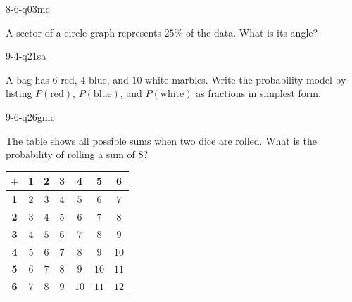 \begin{practiceQuestion}{8-6-q03}{mc}
\begin{questionText}
A sector of a circle graph represents $25\%$ of the data. What is its angle?
\end{questionText}
\end{practiceQuestion}

\begin{practiceQuestion}{9-4-q21}{sa}
\begin{questionText}
A bag has $6$ red, $4$ blue, and $10$ white marbles. Write the probability model by listing $P(\text{red})$, $P(\text{blue})$, and $P(\text{white})$ as fractions in simplest form.
\end{questionText}
\end{practiceQuestion}

\begin{practiceQuestion}{9-6-q26}{gmc}
\begin{questionText}
The table shows all possible sums when two dice are rolled. What is the probability of rolling a sum of $8$?

\begin{center}
\begin{tabular}{|c|c|c|c|c|c|c|}
\hline
$+$ & \textbf{1} & \textbf{2} & \textbf{3} & \textbf{4} & \textbf{5} & \textbf{6} \\
\hline
\textbf{1} & $2$ & $3$ & $4$ & $5$ & $6$ & $7$ \\
\hline
\textbf{2} & $3$ & $4$ & $5$ & $6$ & $7$ & \cellcolor{funBlue!20}$8$ \\
\hline
\textbf{3} & $4$ & $5$ & $6$ & $7$ & \cellcolor{funBlue!20}$8$ & $9$ \\
\hline
\textbf{4} & $5$ & $6$ & $7$ & \cellcolor{funBlue!20}$8$ & $9$ & $10$ \\
\hline
\textbf{5} & $6$ & $7$ & \cellcolor{funBlue!20}$8$ & $9$ & $10$ & $11$ \\
\hline
\textbf{6} & $7$ & \cellcolor{funBlue!20}$8$ & $9$ & $10$ & $11$ & $12$ \\
\hline
\end{tabular}
\end{center}
\end{questionText}
\end{practiceQuestion}

